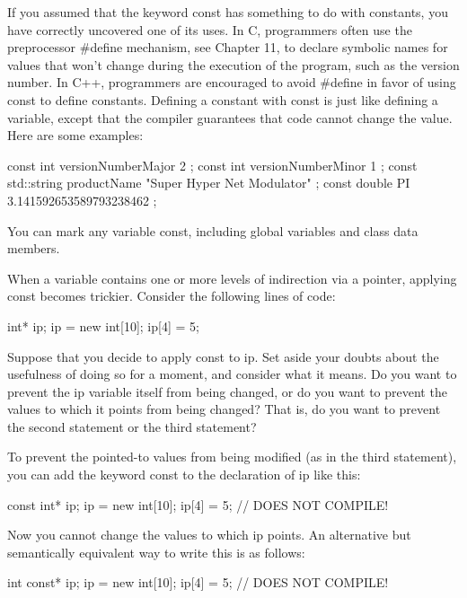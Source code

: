 
If you assumed that the keyword const has something to do with constants, you have correctly uncovered one of its uses. In C, programmers often use the preprocessor \#define mechanism, see Chapter 11, to declare symbolic names for values that won’t change during the execution of the program, such as the version number. In C++, programmers are encouraged to avoid \#define in favor of using const to define constants. Defining a constant with const is just like defining a variable, except that the compiler guarantees that code cannot change the value. Here are some examples:

\begin{cpp}
const int versionNumberMajor { 2 };
const int versionNumberMinor { 1 };
const std::string productName { "Super Hyper Net Modulator" };
const double PI { 3.141592653589793238462 };
\end{cpp}

You can mark any variable const, including global variables and class data members.


When a variable contains one or more levels of indirection via a pointer, applying const becomes trickier. Consider the following lines of code:

\begin{cpp}
int* ip;
ip = new int[10];
ip[4] = 5;
\end{cpp}

Suppose that you decide to apply const to ip. Set aside your doubts about the usefulness of doing so for a moment, and consider what it means. Do you want to prevent the ip variable itself from being changed, or do you want to prevent the values to which it points from being changed? That is, do you want to prevent the second statement or the third statement?

To prevent the pointed-to values from being modified (as in the third statement), you can add the keyword const to the declaration of ip like this:

\begin{cpp}
const int* ip;
ip = new int[10];
ip[4] = 5; // DOES NOT COMPILE!
\end{cpp}

Now you cannot change the values to which ip points. An alternative but semantically equivalent way to write this is as follows:

\begin{cpp}
int const* ip;
ip = new int[10];
ip[4] = 5; // DOES NOT COMPILE!
\end{cpp}

